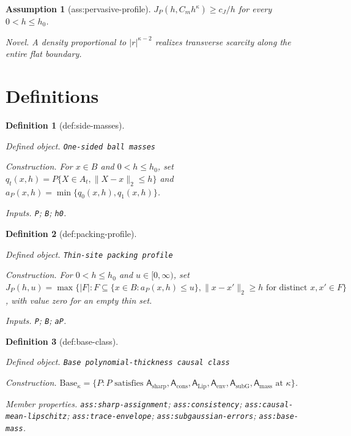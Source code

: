 \documentclass{article}
\newtheorem{assumption}{Assumption}
\newtheorem{definition}{Definition}
\begin{document}
\begin{assumption}[ass:pervasive-profile]\label{ass:pervasive-profile}
\(J_P(h,C_mh^\kappa)\geq c_J/h\) for every \(0<h\leq h_0\).
\par\smallskip\noindent\emph{Novel.} A density proportional to \(|r|^{\kappa-2}\) realizes transverse scarcity along the entire flat boundary.
\end{assumption}

\section{Definitions}

\begin{definition}[def:side-masses]\label{def:side-masses}
\par\smallskip\noindent\emph{Defined object.} \texttt{One-\allowbreak{}sided ball masses}
\par\smallskip\noindent\emph{Construction.} For \(x\in B\) and \(0<h\leq h_0\), set \(q_t(x,h)=P\{X\in A_t,\|X-x\|_2\leq h\}\) and \(a_P(x,h)=\min\{q_0(x,h),q_1(x,h)\}\).
\par\smallskip\noindent\emph{Inputs.} \texttt{P}; \texttt{B}; \texttt{h0}.
\end{definition}

\begin{definition}[def:packing-profile]\label{def:packing-profile}
\par\smallskip\noindent\emph{Defined object.} \texttt{Thin-\allowbreak{}site packing profile}
\par\smallskip\noindent\emph{Construction.} For \(0<h\leq h_0\) and \(u\in[0,\infty)\), set
\(J_P(h,u)=\max\{|F|:F\subseteq\{x\in B:a_P(x,h)\leq u\},
\|x-x'\|_2\geq h\text{ for distinct }x,x'\in F\}\), with value zero for an
empty thin set.
\par\smallskip\noindent\emph{Inputs.} \texttt{P}; \texttt{B}; \texttt{aP}.
\end{definition}

\begin{definition}[def:base-class]\label{def:base-class}
\par\smallskip\noindent\emph{Defined object.} \texttt{Base polynomial-\allowbreak{}thickness causal class}
\par\smallskip\noindent\emph{Construction.} \(\mathrm{Base}_\kappa=\{P:P\text{ satisfies }\mathsf A_{\mathrm{sharp}},\mathsf A_{\mathrm{cons}},\mathsf A_{\mathrm{Lip}},\mathsf A_{\mathrm{env}},\mathsf A_{\mathrm{subG}},\mathsf A_{\mathrm{mass}}\text{ at }\kappa\}\).
\par\smallskip\noindent\emph{Member properties.} \texttt{ass:\allowbreak{}sharp-\allowbreak{}assignment}; \texttt{ass:\allowbreak{}consistency}; \texttt{ass:\allowbreak{}causal-\allowbreak{}mean-\allowbreak{}lipschitz}; \texttt{ass:\allowbreak{}trace-\allowbreak{}envelope}; \texttt{ass:\allowbreak{}subgaussian-\allowbreak{}errors}; \texttt{ass:\allowbreak{}base-\allowbreak{}mass}.
\end{definition}
\end{document}
